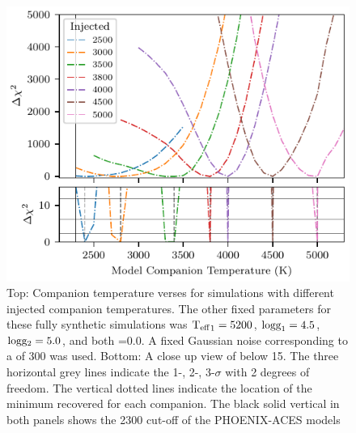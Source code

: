 \begin{figure}
    \centering
    \includegraphics[width=0.7\linewidth]{figures/companion_recovery/chi2_shape_investigation_with_delta}
    \caption[Shape of simulated \textchisquared{} with different injected companion temperatures.]{Top: Companion temperature verses \textchisquared{} for simulations with different injected companion temperatures.
        The other fixed parameters for these fully synthetic simulations was \({\textrm{T}_{\mathrm{eff}}}_{1}=5200\)\K{}, \(\textrm{logg}_{1}=4.5\), \(\textrm{logg}{}_{2}=5.0\), and both \feh{}=0.0.
        A fixed Gaussian noise corresponding to a \snr{} of 300 was used.
        Bottom: A close up view of \textchisquared{} below 15.
        The three horizontal grey lines indicate the 1-, 2-, 3-$\sigma$ with 2 degrees of freedom.
        The vertical dotted lines indicate the location of the minimum \textchisquared{} recovered for each companion.
        The black solid vertical in both panels shows the 2300\K{} cut-off of the {PHOENIX-ACES} models}
    \label{fig:injection_shape}
\end{figure}

